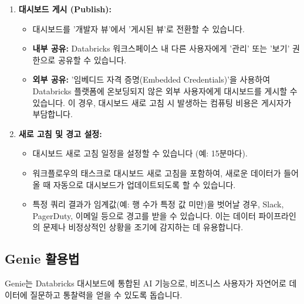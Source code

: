 \documentclass[11pt,a4paper]{article}
\theoremstyle{definition}
\begin{document}
\begin{enumerate}
\begin{itemize}
        \item AI 어시스턴트가 자동으로 '총 수익', '경로별 수익 분포', '픽업 지역별 여행 횟수' 등 다양한 시각화 아이디어를 제안합니다.
        \item 원하는 제안을 선택하면, 어시스턴트가 자동으로 시각화(예: 막대 차트)를 생성합니다.
        \item 생성된 시각화의 제목, 설명, 데이터셋, 차트 유형(막대, 산점도 등), 색상 등을 왼쪽 패널에서 수정할 수 있습니다.
        \item 어시스턴트가 생성한 SQL 코드를 확인하고, 필요에 따라 추가적인 지시를 내리거나 수락/거부할 수 있습니다.
    \end{itemize}
    \item \textbf{대시보드 게시 (Publish):}
    \begin{itemize}
        \item 대시보드를 '개발자 뷰'에서 '게시된 뷰'로 전환할 수 있습니다.
        \item \textbf{내부 공유:} Databricks 워크스페이스 내 다른 사용자에게 '관리' 또는 '보기' 권한으로 공유할 수 있습니다.
        \item \textbf{외부 공유:} '임베디드 자격 증명(Embedded Credentials)'을 사용하여 Databricks 플랫폼에 온보딩되지 않은 외부 사용자에게 대시보드를 게시할 수 있습니다. 이 경우, 대시보드 새로 고침 시 발생하는 컴퓨팅 비용은 게시자가 부담합니다.
    \end{itemize}
    \item \textbf{새로 고침 및 경고 설정:}
    \begin{itemize}
        \item 대시보드 새로 고침 일정을 설정할 수 있습니다 (예: 15분마다).
        \item 워크플로우의 태스크로 대시보드 새로 고침을 포함하여, 새로운 데이터가 들어올 때 자동으로 대시보드가 업데이트되도록 할 수 있습니다.
        \item 특정 쿼리 결과가 임계값(예: 행 수가 특정 값 미만)을 벗어날 경우, Slack, PagerDuty, 이메일 등으로 경고를 받을 수 있습니다. 이는 데이터 파이프라인의 문제나 비정상적인 상황을 조기에 감지하는 데 유용합니다.
    \end{itemize}
\end{enumerate}

\subsection{Genie 활용법}
Genie는 Databricks 대시보드에 통합된 AI 기능으로, 비즈니스 사용자가 자연어로 데이터에 질문하고 통찰력을 얻을 수 있도록 돕습니다.
\end{document}
